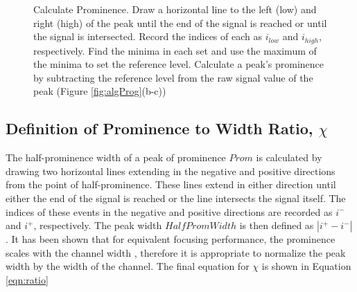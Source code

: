 \begin{figure}
\begin{algorithm}[H]
\DontPrintSemicolon
{}
\caption{\label{alg:prom}Calculate Prominence. Draw a horizontal line to the left (low) and right (high) of the peak until the end of the signal is reached or until the signal is intersected. Record the indices of each as $i_{low}$ and $i_{high}$, respectively. Find the minima in each set and use the maximum of the minima to set the reference level. Calculate a peak's prominence by subtracting the reference level from the raw signal value of the peak (Figure \ref{fig:algProg}(b-c))}
\end{algorithm}
\end{figure}

\subsection{Definition of Prominence to Width Ratio, $\chi$}
\label{ssec:promToWidth}
The half-prominence width of a peak of prominence $Prom$ is calculated by drawing two horizontal lines extending in the negative and positive directions from the point of half-prominence. These lines extend in either direction until either the end of the signal is reached or the line intersects the signal itself. The indices of these events in the negative and positive directions are recorded as $i^-$ and $i^+$, respectively. The peak width $HalfPromWidth$ is then defined as $|i^+-i^-|$. It has been shown that for equivalent focusing performance, the prominence scales with the channel width \cite{ley2016continuum}, therefore it is appropriate to normalize the peak width by the width of the channel. The final equation for $\chi$ is shown in Equation \ref{eqn:ratio}

